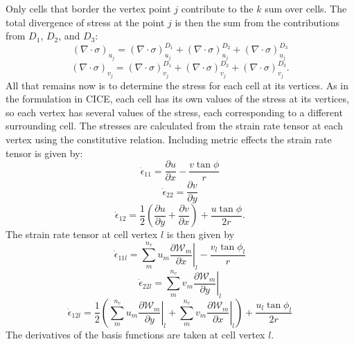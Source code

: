 Only cells that border the vertex point $j$ contribute to the $k$ sum over cells. The total divergence of stress at the point $j$ is then the sum from the contributions from $D_1$, $D_2$, and $D_3$:
\begin{equation}
(\nabla \cdot \sigma)_{u_j} = (\nabla \cdot \sigma)_{u_j}^{D_1} + (\nabla \cdot \sigma)_{u_j}^{D_2} + (\nabla \cdot \sigma)_{u_j}^{D_3}
\end{equation}
\begin{equation}
(\nabla \cdot \sigma)_{v_j} = (\nabla \cdot \sigma)_{v_j}^{D_1} + (\nabla \cdot \sigma)_{v_j}^{D_2} + (\nabla \cdot \sigma)_{v_j}^{D_3}.
\end{equation}
All that remains now is to determine the stress for each cell at its vertices. As in the formulation in CICE, each cell has its own values of the stress at its vertices, so each vertex has several values of the stress, each corresponding to a different surrounding cell. The stresses are calculated from the strain rate tensor at each vertex using the constitutive relation. Including metric effects \citep{Batchelor67} the strain rate tensor is given by:
\begin{equation}
\dot{\epsilon}_{11} = \frac{\partial{u}}{\partial{x}} - \frac{v \tan{\phi}}{r}
\end{equation}
\begin{equation}
\dot{\epsilon}_{22} = \frac{\partial{v}}{\partial{y}}
\end{equation}
\begin{equation}
\dot{\epsilon}_{12} = \frac{1}{2} \left( \frac{\partial{u}}{\partial{y}} + \frac{\partial{v}}{\partial{x}} \right) + \frac{u \tan{\phi}}{2 r}.
\end{equation}
The strain rate tensor at cell vertex $l$ is then given by 
\begin{equation}
\dot{\epsilon}_{11{l}} =  \sum_{m}^{n_v} u_{m} \left. \frac{\partial{\mathcal{W}_{m}}}{\partial{x}} \right| _{l} - \frac{v_{l} \tan{\phi_{l}}}{r}
\end{equation}
\begin{equation}
\dot{\epsilon}_{22{l}} =  \sum_{m}^{n_v} v_{m} \left. \frac{\partial{\mathcal{W}_{m}}}{\partial{y}} \right| _{l} 
\end{equation}
\begin{equation}
\dot{\epsilon}_{12{l}} = \frac{1}{2} \left( \sum_{m}^{n_v} u_{m} \left. \frac{\partial{\mathcal{W}_{m}}}{\partial{y}} \right| _{l} +\sum_{m}^{n_v} v_{m} \left. \frac{\partial{\mathcal{W}_{m}}}{\partial{x}} \right| _{l}  \right) + \frac{u_{l} \tan{\phi_{l}}}{2 r}
\end{equation}
The derivatives of the basis functions are taken at cell vertex $l$.

